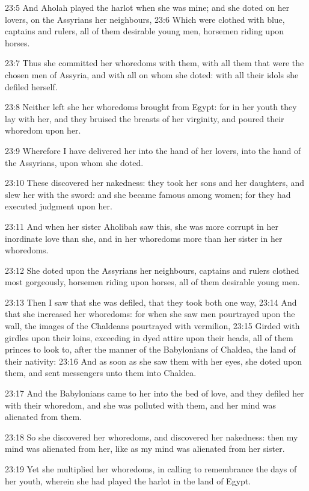 23:5 And Aholah played the harlot when she was mine; and she doted on her lovers, on the Assyrians her neighbours, 23:6 Which were clothed with blue, captains and rulers, all of them desirable young men, horsemen riding upon horses.

23:7 Thus she committed her whoredoms with them, with all them that were the chosen men of Assyria, and with all on whom she doted: with all their idols she defiled herself.

23:8 Neither left she her whoredoms brought from Egypt: for in her youth they lay with her, and they bruised the breasts of her virginity, and poured their whoredom upon her.

23:9 Wherefore I have delivered her into the hand of her lovers, into the hand of the Assyrians, upon whom she doted.

23:10 These discovered her nakedness: they took her sons and her daughters, and slew her with the sword: and she became famous among women; for they had executed judgment upon her.

23:11 And when her sister Aholibah saw this, she was more corrupt in her inordinate love than she, and in her whoredoms more than her sister in her whoredoms.

23:12 She doted upon the Assyrians her neighbours, captains and rulers clothed most gorgeously, horsemen riding upon horses, all of them desirable young men.

23:13 Then I saw that she was defiled, that they took both one way, 23:14 And that she increased her whoredoms: for when she saw men pourtrayed upon the wall, the images of the Chaldeans pourtrayed with vermilion, 23:15 Girded with girdles upon their loins, exceeding in dyed attire upon their heads, all of them princes to look to, after the manner of the Babylonians of Chaldea, the land of their nativity: 23:16 And as soon as she saw them with her eyes, she doted upon them, and sent messengers unto them into Chaldea.

23:17 And the Babylonians came to her into the bed of love, and they defiled her with their whoredom, and she was polluted with them, and her mind was alienated from them.

23:18 So she discovered her whoredoms, and discovered her nakedness: then my mind was alienated from her, like as my mind was alienated from her sister.

23:19 Yet she multiplied her whoredoms, in calling to remembrance the days of her youth, wherein she had played the harlot in the land of Egypt.


